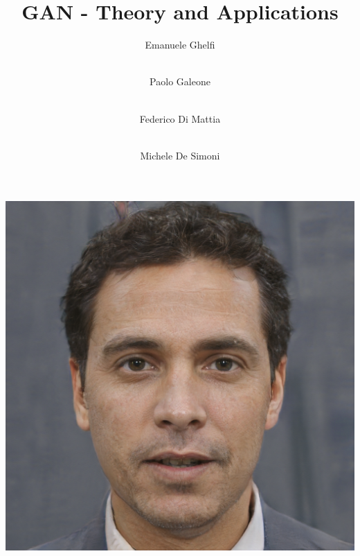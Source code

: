 \documentclass{beamer}
\title[GAN]
{GAN - Theory and Applications}
\author
{Emanuele Ghelfi  \and \\ Paolo Galeone \and \\ Federico Di Mattia \and \\ Michele De Simoni}
\begin{document}
 
{
  \begin{frame}
    \titlepage
  \end{frame}
}


{
\begin{frame}[plain]
\centering
	\href{run:images/stylegan/out.mp4?autostart&loop&noprogress}{\includegraphics[height=\paperheight]{images/stylegan/099000.png}}
\end{frame}
}
\end{document}
